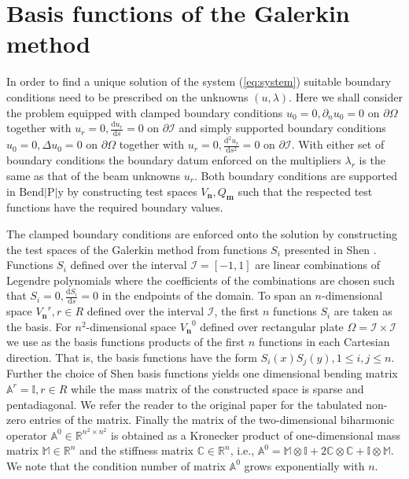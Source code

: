 \documentclass{marine_2015}
\newcommand{\Vh}{\ensuremath{V_{\mathbf{n}}}}
\newcommand{\Qh}{\ensuremath{Q_{\mathbf{m}}}}
\newcommand{\tderiv}[2]{\ensuremath{\tfrac{\mathrm{d}#1}{\mathrm{d}#2}}}
\begin{document}
\section{Basis functions of the Galerkin method}
\label{sec:basis}
In order to find a unique solution of the system (\ref{eq:system}) suitable
boundary conditions need to be prescribed on the unknowns $(u, \lambda)$. Here 
we shall consider the problem equipped with clamped boundary conditions 
$u_0=0, \partial_n u_0=0$ on $\partial\Omega$ together with 
$u_r=0, \tderiv{u_r}{s}=0$ on $\partial\mathcal{I}$ and simply supported
boundary conditions $u_0=0, \Delta u_0=0$ on $\partial\Omega$ together with 
$u_r=0, \tderiv{^2u_r}{s^2}=0$ on $\partial\mathcal{I}$. With either set of boundary
conditions the boundary datum enforced on the multipliers $\lambda_r$ is the
same as that of the beam unknowns $u_r$. Both boundary conditions are 
supported in $\text{Bend}\!\left|\text{P}\right|\!\text{y}$ by constructing test 
spaces $\Vh, \Qh$ such that the respected test functions have the required 
boundary values. 

The clamped boundary conditions are enforced onto the solution by constructing
the test spaces of the Galerkin method from functions $S_i$ presented in Shen
\cite{shenpaper}. Functions $S_i$ defined over the interval
$\mathcal{I}=\left[-1, 1\right]$ are linear combinations of Legendre
polynomials where the coefficients of the combinations are chosen such that
$S_i=0, \tderiv{S_i}{s}=0$ in the endpoints of the domain. To span an $n$-dimensional 
space $\Vh^r, r\in R$ defined over the interval $\mathcal{I}$, the first 
$n$ functions $S_i$ are taken as the basis. For $n^2$-dimensional space $\Vh^0$ 
defined over rectangular plate $\Omega=\mathcal{I}\times\mathcal{I}$ we use as the 
basis functions products of the first $n$ functions in each Cartesian
direction. That is, the basis functions have the form
$S_i\left(x\right)S_j\left(y\right), 1\leq i, j \leq n$. Further the choice of Shen 
basis functions yields one dimensional bending matrix $\mathbb{A}^r=\mathbb{I},
r\in R$ while the mass matrix of the constructed space is sparse and pentadiagonal. 
We refer the reader to the original paper \cite{shenpaper} for the tabulated non-zero entries 
of the matrix. Finally the matrix of the two-dimensional 
biharmonic operator $\mathbb{A}^0\in\mathbb{R}^{n^2\times n^2}$ is obtained
as a Kronecker product of one-dimensional mass matrix $\mathbb{M}\in\mathbb{R}^n$ and 
the stiffness matrix $\mathbb{C}\in\mathbb{R}^n$, i.e., $\mathbb{A}^0 = \mathbb{M}\otimes\mathbb{I} + 
2\mathbb{C}\otimes\mathbb{C} + \mathbb{I}\otimes\mathbb{M}$. We note that the
condition number of matrix $\mathbb{A}^0$ grows exponentially with $n$.
\end{document}
